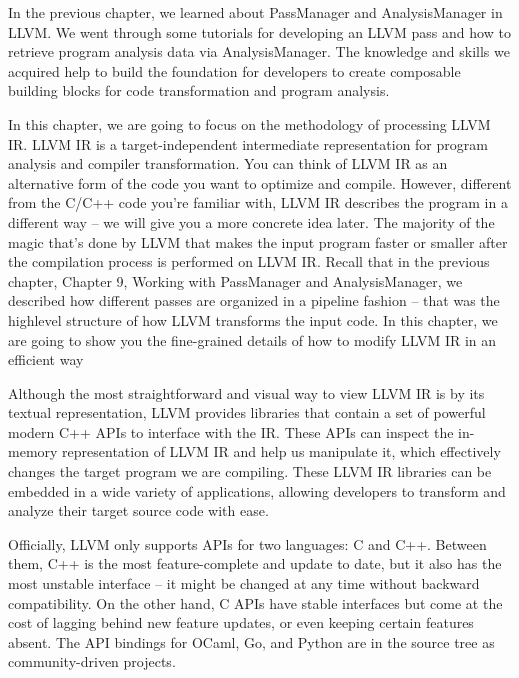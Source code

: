 In the previous chapter, we learned about PassManager and AnalysisManager in LLVM. We went through some tutorials for developing an LLVM pass and how to retrieve program analysis data via AnalysisManager. The knowledge and skills we acquired help to build the foundation for developers to create composable building blocks for code transformation and program analysis.

In this chapter, we are going to focus on the methodology of processing LLVM IR. LLVM IR is a target-independent intermediate representation for program analysis and compiler transformation. You can think of LLVM IR as an alternative form of the code you want to optimize and compile. However, different from the C/C++ code you're familiar with, LLVM IR describes the program in a different way – we will give you a more concrete idea later. The majority of the magic that's done by LLVM that makes the input program faster or smaller after the compilation process is performed on LLVM IR. Recall that in the previous chapter, Chapter 9, Working with PassManager and AnalysisManager, we described how different passes are organized in a pipeline fashion – that was the highlevel structure of how LLVM transforms the input code. In this chapter, we are going to show you the fine-grained details of how to modify LLVM IR in an efficient way

Although the most straightforward and visual way to view LLVM IR is by its textual representation, LLVM provides libraries that contain a set of powerful modern C++ APIs to interface with the IR. These APIs can inspect the in-memory representation of LLVM IR and help us manipulate it, which effectively changes the target program we are compiling. These LLVM IR libraries can be embedded in a wide variety of applications, allowing developers to transform and analyze their target source code with ease.

\begin{tcolorbox}[colback=blue!5!white,colframe=blue!75!black, fonttitle=\bfseries,title=LLVM APIs for different programming languages]	
\hspace*{0.7cm}Officially, LLVM only supports APIs for two languages: C and C++. Between them, C++ is the most feature-complete and update to date, but it also has the most unstable interface – it might be changed at any time without backward compatibility. On the other hand, C APIs have stable interfaces but come at the cost of lagging behind new feature updates, or even keeping certain features absent. The API bindings for OCaml, Go, and Python are in the source tree as community-driven projects.
\end{tcolorbox}


